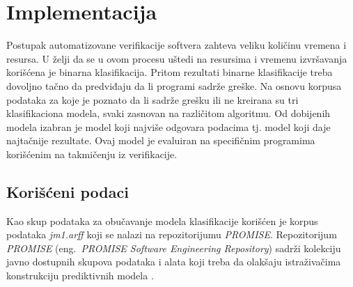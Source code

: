 \documentclass[12pt,oneside]{memoir}
\begin{document}



\chapter{Implementacija}

Postupak automatizovane verifikacije softvera zahteva veliku količinu vremena i resursa. 
U želji da se u ovom procesu uštedi na resursima i vremenu izvršavanja korišćena je binarna klasifikacija. Pritom rezultati binarne klasifikacije treba dovoljno tačno da predviđaju da li programi sadrže greške. Na osnovu korpusa podataka za koje je poznato da li sadrže grešku ili ne kreirana su tri klasifikaciona modela, svaki zasnovan na različitom algoritmu. Od dobijenih modela izabran je model koji najviše odgovara podacima tj. model koji daje najtačnije rezultate. Ovaj model je evaluiran na specifičnim programima korišćenim na takmičenju iz verifikacije. 

\section{Korišćeni podaci}
\label{kor_podaci}

Kao skup podataka za obučavanje modela klasifikacije korišćen je korpus podataka \textit{jm1.arff} koji se nalazi na repozitorijumu \textit{PROMISE}. Repozitorijum \textit{PROMISE} (eng.~\textit{PROMISE Software Engineering Repository}) sadrži kolekciju javno dostupnih skupova podataka i alata koji treba da olakšaju istraživačima konstrukciju prediktivnih modela \cite{promise}. 
\end{document}
